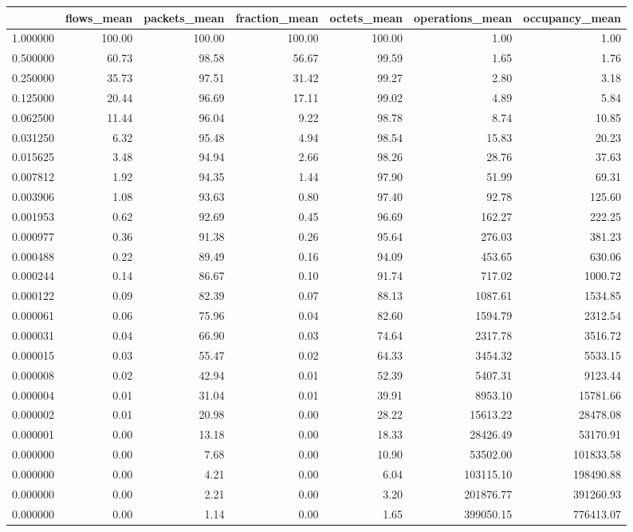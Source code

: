 \begin{tabular}{lrrrrrr}
\toprule
 & flows_mean & packets_mean & fraction_mean & octets_mean & operations_mean & occupancy_mean \\
\midrule
1.000000 & 100.00 & 100.00 & 100.00 & 100.00 & 1.00 & 1.00 \\
0.500000 & 60.73 & 98.58 & 56.67 & 99.59 & 1.65 & 1.76 \\
0.250000 & 35.73 & 97.51 & 31.42 & 99.27 & 2.80 & 3.18 \\
0.125000 & 20.44 & 96.69 & 17.11 & 99.02 & 4.89 & 5.84 \\
0.062500 & 11.44 & 96.04 & 9.22 & 98.78 & 8.74 & 10.85 \\
0.031250 & 6.32 & 95.48 & 4.94 & 98.54 & 15.83 & 20.23 \\
0.015625 & 3.48 & 94.94 & 2.66 & 98.26 & 28.76 & 37.63 \\
0.007812 & 1.92 & 94.35 & 1.44 & 97.90 & 51.99 & 69.31 \\
0.003906 & 1.08 & 93.63 & 0.80 & 97.40 & 92.78 & 125.60 \\
0.001953 & 0.62 & 92.69 & 0.45 & 96.69 & 162.27 & 222.25 \\
0.000977 & 0.36 & 91.38 & 0.26 & 95.64 & 276.03 & 381.23 \\
0.000488 & 0.22 & 89.49 & 0.16 & 94.09 & 453.65 & 630.06 \\
0.000244 & 0.14 & 86.67 & 0.10 & 91.74 & 717.02 & 1000.72 \\
0.000122 & 0.09 & 82.39 & 0.07 & 88.13 & 1087.61 & 1534.85 \\
0.000061 & 0.06 & 75.96 & 0.04 & 82.60 & 1594.79 & 2312.54 \\
0.000031 & 0.04 & 66.90 & 0.03 & 74.64 & 2317.78 & 3516.72 \\
0.000015 & 0.03 & 55.47 & 0.02 & 64.33 & 3454.32 & 5533.15 \\
0.000008 & 0.02 & 42.94 & 0.01 & 52.39 & 5407.31 & 9123.44 \\
0.000004 & 0.01 & 31.04 & 0.01 & 39.91 & 8953.10 & 15781.66 \\
0.000002 & 0.01 & 20.98 & 0.00 & 28.22 & 15613.22 & 28478.08 \\
0.000001 & 0.00 & 13.18 & 0.00 & 18.33 & 28426.49 & 53170.91 \\
0.000000 & 0.00 & 7.68 & 0.00 & 10.90 & 53502.00 & 101833.58 \\
0.000000 & 0.00 & 4.21 & 0.00 & 6.04 & 103115.10 & 198490.88 \\
0.000000 & 0.00 & 2.21 & 0.00 & 3.20 & 201876.77 & 391260.93 \\
0.000000 & 0.00 & 1.14 & 0.00 & 1.65 & 399050.15 & 776413.07 \\
\bottomrule
\end{tabular}
